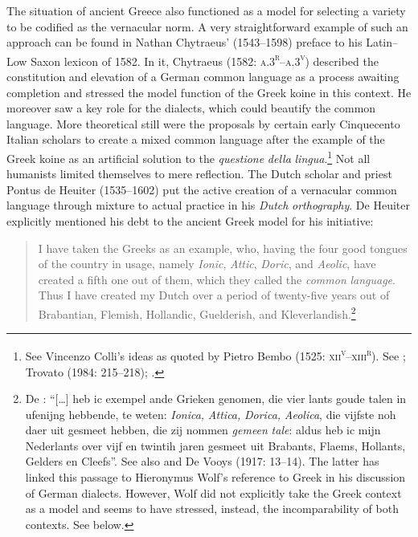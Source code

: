 \documentclass[output=paper]{langsci/langscibook}
\begin{document}
The situation of ancient Greece also functioned as a model for selecting a variety to be codified as the vernacular norm. A very straightforward example of such an approach can be found in Nathan Chytraeus’ (1543–1598) preface to his Latin–Low Saxon lexicon of 1582. In it, Chytraeus (1582: \textsc{a.3}\textsc{\textsuperscript{r}}\textsc{–a.3}\textsc{\textsuperscript{v}}) described the constitution and elevation of a German common language as a process awaiting completion and stressed the model function of the Greek koine in this context. He moreover saw a key role for the dialects, which could beautify the common language. More theoretical still were the proposals by certain early Cinquecento Italian scholars to create a mixed common language after the example of the Greek koine as an artificial solution to the \textit{questione} \textit{della} \textit{lingua}.\footnote{See Vincenzo Colli’s ideas as quoted by Pietro Bembo (1525: \textsc{xii}\textsc{\textsuperscript{v}}\textsc{–xiii}\textsc{\textsuperscript{r}}). See \citet[119]{Melzi1966}; Trovato (1984: 215–218); \citet[12]{Trapp1990}.} Not all humanists limited themselves to mere reflection. The Dutch scholar and priest Pontus de Heuiter (1535–1602) put the active creation of a vernacular common language through mixture to actual practice in his \textit{Dutch} \textit{orthography}. De Heuiter explicitly mentioned his debt to the ancient Greek model for his initiative:

\begin{quote}
I have taken the Greeks as an example, who, having the four good tongues of the country in usage, namely \textit{Ionic}, \textit{Attic}, \textit{Doric}, and \textit{Aeolic}, have created a fifth one out of them, which they called the \textit{common} \textit{language}. Thus I have created my Dutch over a period of twenty-five years out of Brabantian, Flemish, Hollandic, Guelderish, and Kleverlandish.\footnote{De \citet[93]{Heuiter1581}: “[…] heb ic exempel ande Grieken genomen, die vier lants goude talen in ufenijng hebbende, te weten: \textit{Ionica,} \textit{Attica,} \textit{Dorica,} \textit{Aeolica}, die vijfste noh daer uit gesmeet hebben, die zij nommen \textit{gemeen} \textit{tale}: aldus heb ic mijn Nederlants over vijf en twintih jaren gesmeet uit Brabants, Flaems, Hollants, Gelders en Cleefs”. See also \citet[110]{Dibbets2008} and De Vooys (1917: 13–14). The latter has linked this passage to Hieronymus Wolf’s reference to Greek in his discussion of German dialects. However, Wolf did not explicitly take the Greek context as a model and seems to have stressed, instead, the incomparability of both contexts. See  below.}
\end{quote}
\end{document}
